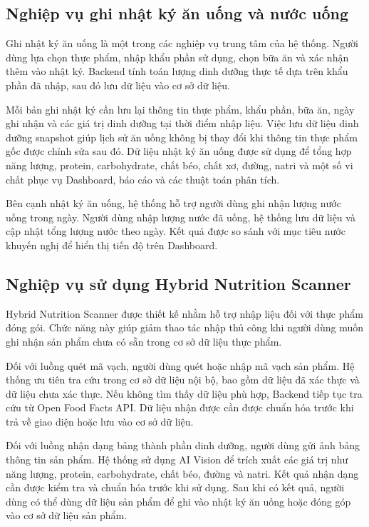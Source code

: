 \documentclass[12pt, a4paper]{report}
\begin{document}
\subsection{Nghiệp vụ ghi nhật ký ăn uống và nước uống}Ghi nhật ký ăn uống là một trong các nghiệp vụ trung tâm của hệ thống. Người dùng lựa chọn thực phẩm, nhập khẩu phần sử dụng, chọn bữa ăn và xác nhận thêm vào nhật ký. Backend tính toán lượng dinh dưỡng thực tế dựa trên khẩu phần đã nhập, sau đó lưu dữ liệu vào cơ sở dữ liệu.

Mỗi bản ghi nhật ký cần lưu lại thông tin thực phẩm, khẩu phần, bữa ăn, ngày ghi nhận và các giá trị dinh dưỡng tại thời điểm nhập liệu. Việc lưu dữ liệu dinh dưỡng snapshot giúp lịch sử ăn uống không bị thay đổi khi thông tin thực phẩm gốc được chỉnh sửa sau đó. Dữ liệu nhật ký ăn uống được sử dụng để tổng hợp năng lượng, protein, carbohydrate, chất béo, chất xơ, đường, natri và một số vi chất phục vụ Dashboard, báo cáo và các thuật toán phân tích.

Bên cạnh nhật ký ăn uống, hệ thống hỗ trợ người dùng ghi nhận lượng nước uống trong ngày. Người dùng nhập lượng nước đã uống, hệ thống lưu dữ liệu và cập nhật tổng lượng nước theo ngày. Kết quả được so sánh với mục tiêu nước khuyến nghị để hiển thị tiến độ trên Dashboard.

\subsection{Nghiệp vụ sử dụng Hybrid Nutrition Scanner}Hybrid Nutrition Scanner được thiết kế nhằm hỗ trợ nhập liệu đối với thực phẩm đóng gói. Chức năng này giúp giảm thao tác nhập thủ công khi người dùng muốn ghi nhận sản phẩm chưa có sẵn trong cơ sở dữ liệu thực phẩm.

Đối với luồng quét mã vạch, người dùng quét hoặc nhập mã vạch sản phẩm. Hệ thống ưu tiên tra cứu trong cơ sở dữ liệu nội bộ, bao gồm dữ liệu đã xác thực và dữ liệu chưa xác thực. Nếu không tìm thấy dữ liệu phù hợp, Backend tiếp tục tra cứu từ Open Food Facts API. Dữ liệu nhận được cần được chuẩn hóa trước khi trả về giao diện hoặc lưu vào cơ sở dữ liệu.

Đối với luồng nhận dạng bảng thành phần dinh dưỡng, người dùng gửi ảnh bảng thông tin sản phẩm. Hệ thống sử dụng AI Vision để trích xuất các giá trị như năng lượng, protein, carbohydrate, chất béo, đường và natri. Kết quả nhận dạng cần được kiểm tra và chuẩn hóa trước khi sử dụng. Sau khi có kết quả, người dùng có thể dùng dữ liệu sản phẩm để ghi vào nhật ký ăn uống hoặc đóng góp vào cơ sở dữ liệu sản phẩm.
\end{document}

